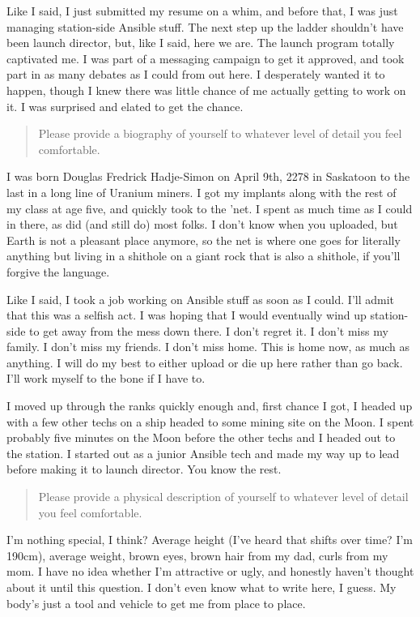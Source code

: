 Like I said, I just submitted my resume on a whim, and before that, I was just managing station-side Ansible stuff. The next step up the ladder shouldn't have been launch director, but, like I said, here we are. The launch program totally captivated me. I was part of a messaging campaign to get it approved, and took part in as many debates as I could from out here. I desperately wanted it to happen, though I knew there was little chance of me actually getting to work on it. I was surprised and elated to get the chance.

\begin{quote}
Please provide a biography of yourself to whatever level of detail you feel comfortable.
\end{quote}

I was born Douglas Fredrick Hadje-Simon on April 9th, 2278 in Saskatoon to the last in a long line of Uranium miners. I got my implants along with the rest of my class at age five, and quickly took to the 'net. I spent as much time as I could in there, as did (and still do) most folks. I don't know when you uploaded, but Earth is not a pleasant place anymore, so the net is where one goes for literally anything but living in a shithole on a giant rock that is also a shithole, if you'll forgive the language.

Like I said, I took a job working on Ansible stuff as soon as I could. I'll admit that this was a selfish act. I was hoping that I would eventually wind up station-side to get away from the mess down there. I don't regret it. I don't miss my family. I don't miss my friends. I don't miss home. This is home now, as much as anything. I will do my best to either upload or die up here rather than go back. I'll work myself to the bone if I have to.

I moved up through the ranks quickly enough and, first chance I got, I headed up with a few other techs on a ship headed to some mining site on the Moon. I spent probably five minutes on the Moon before the other techs and I headed out to the station. I started out as a junior Ansible tech and made my way up to lead before making it to launch director. You know the rest.

\begin{quote}
Please provide a physical description of yourself to whatever level of detail you feel comfortable.
\end{quote}

I'm nothing special, I think? Average height (I've heard that shifts over time? I'm 190cm), average weight, brown eyes, brown hair from my dad, curls from my mom. I have no idea whether I'm attractive or ugly, and honestly haven't thought about it until this question. I don't even know what to write here, I guess. My body's just a tool and vehicle to get me from place to place.


